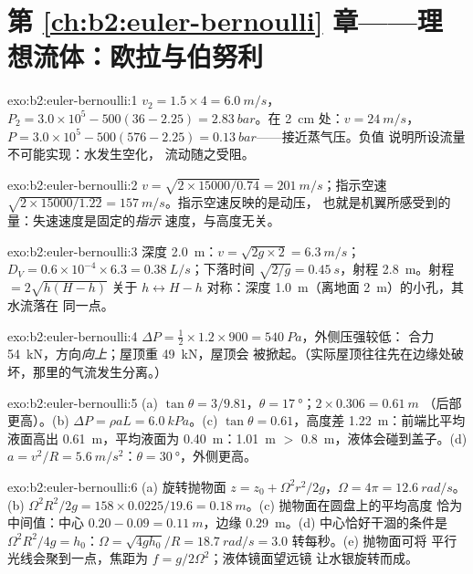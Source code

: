 \section*{第 \ref{ch:b2:euler-bernoulli} 章——理想流体：欧拉与伯努利}

\begin{solution}{exo:b2:euler-bernoulli:1}
$v_2 = 1.5 \times 4 = \qty{6.0}{m/s}$，$P_2 = 3.0 \times 10^5 - 500(36 - 2.25) =
\qty{2.83}{bar}$。在 \qty{2}{cm} 处：$v = \qty{24}{m/s}$，$P = 3.0 \times 10^5 - 500
(576 - 2.25) = \qty{0.13}{bar}$——接近蒸气压。负值
说明所设流量不可能实现：水发生空化，
流动随之受阻。
\end{solution}

\begin{solution}{exo:b2:euler-bernoulli:2}
$v = \sqrt{2 \times 15000/0.74} = \qty{201}{m/s}$；指示空速 $\sqrt{2 \times 15000/
1.22} = \qty{157}{m/s}$。指示空速反映的是动压，
也就是机翼所感受到的量：失速速度是固定的\emph{指示}
速度，与高度无关。
\end{solution}

\begin{solution}{exo:b2:euler-bernoulli:3}
深度 \qty{2.0}{m}：$v = \sqrt{2g \times 2} = \qty{6.3}{m/s}$；$D_V = 0.6 \times 10^{-4}
\times 6.3 = \qty{0.38}{L/s}$；下落时间 $\sqrt{2/g} = \qty{0.45}{s}$，射程
\qty{2.8}{m}。射程 $= 2\sqrt{h(H - h)}$ 关于 $h \leftrightarrow H -
h$ 对称：深度 \qty{1.0}{m}（离地面 \qty{2}{m}）的小孔，其水流落在
同一点。
\end{solution}

\begin{solution}{exo:b2:euler-bernoulli:4}
$\Delta P = \tfrac12 \times 1.2 \times 900 = \qty{540}{Pa}$，外侧压强较低：
合力 \qty{54}{kN}，方向\emph{向上}；屋顶重 \qty{49}{kN}，屋顶会
被掀起。（实际屋顶往往先在边缘处破坏，那里的气流发生分离。）
\end{solution}

\begin{solution}{exo:b2:euler-bernoulli:5}
(a) $\tan\theta = 3/9.81$，$\theta = \qty{17}{\degree}$；$2 \times 0.306 = \qty{0.61}{m}$
（后部更高）。(b) $\Delta P = \rho aL = \qty{6.0}{kPa}$。(c) $\tan\theta =
0.61$，高度差 \qty{1.22}{m}：前端比平均液面高出
\qty{0.61}{m}，平均液面为 \qty{0.40}{m}：\qty{1.01}{m} $>$ \qty{0.8}{m}，液体会碰到盖子。(d) $a = v^2/R =
\qty{5.6}{m/s^2}$：$\theta = \qty{30}{\degree}$，外侧更高。
\end{solution}

\begin{solution}{exo:b2:euler-bernoulli:6}
(a) 旋转抛物面 $z = z_0 + \Omega^2r^2/2g$，$\Omega = 4\pi = \qty{12.6}{rad/s}$。(b)
$\Omega^2R^2/2g = 158 \times 0.0225/19.6 = \qty{0.18}{m}$。(c) 抛物面在圆盘上的平均高度
恰为中间值：中心 $0.20 - 0.09 = \qty{0.11}{m}$，边缘
\qty{0.29}{m}。(d) 中心恰好干涸的条件是 $\Omega^2R^2/4g = h_0$：$\Omega = \sqrt{4gh_0}/R =
\qty{18.7}{rad/s} = 3.0$ 转每秒。(e) 抛物面可将
平行光线会聚到一点，焦距为 $f = g/2\Omega^2$；液体镜面望远镜
让水银旋转而成。
\end{solution}

